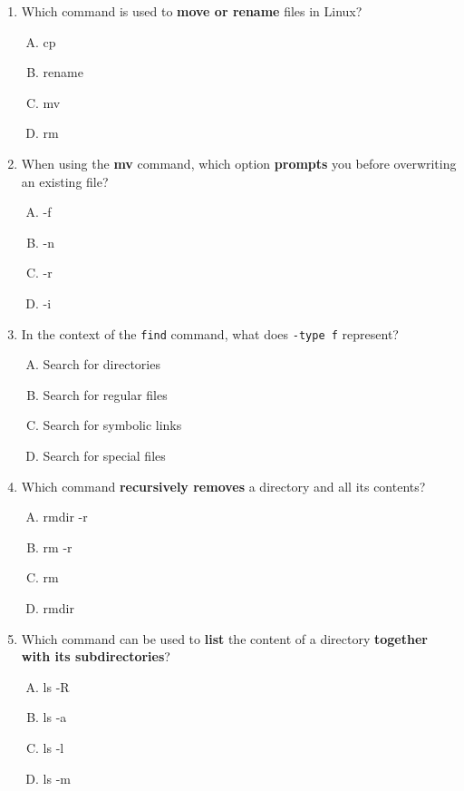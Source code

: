 \documentclass[a4paper]{report}
\begin{document}
\begin{enumerate}[1.]
    \item Which command is used to \textbf{move or rename} files in Linux?  
    \begin{enumerate}[A)]
        \item cp  
        \item rename  
        \item mv  
        \item rm  
    \end{enumerate}

    \item When using the \textbf{mv} command, which option \textbf{prompts} you before overwriting an existing file?  
    \begin{enumerate}[A)]
        \item -f  
        \item -n  
        \item -r  
        \item -i  
    \end{enumerate}

    \item In the context of the \texttt{find} command, what does \texttt{-type f} represent?  
    \begin{enumerate}[A)]
        \item Search for directories  
        \item Search for regular files  
        \item Search for symbolic links  
        \item Search for special files  
    \end{enumerate}

    \item Which command \textbf{recursively removes} a directory and all its contents?  
    \begin{enumerate}[A)]
        \item rmdir -r  
        \item rm -r  
        \item rm  
        \item rmdir  
    \end{enumerate}

    \item Which command can be used to \textbf{list} the content of a directory \textbf{together with its subdirectories}?  
    \begin{enumerate}[A)]
        \item ls -R  
        \item ls -a  
        \item ls -l  
        \item ls -m  
    \end{enumerate}


\end{enumerate}
\end{document}
